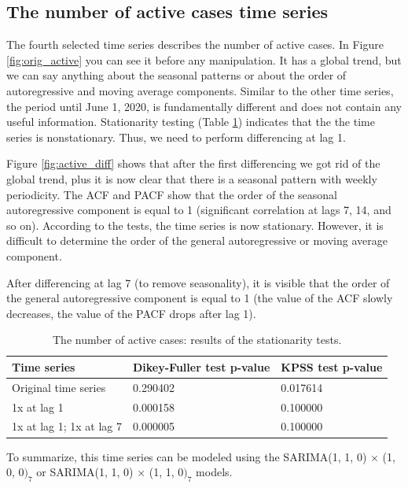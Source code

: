 \subsection{The number of active cases time series}

The fourth selected time series describes the number of active cases. In Figure \ref{fig:orig_active} you can see it before any manipulation. It has a global trend, but we can say anything about the seasonal patterns or about the order of autoregressive and moving average components. Similar to the other time series, the period until June 1, 2020, is fundamentally different and does not contain any useful information. Stationarity testing (Table \ref{tab:active_tests_table}) indicates that the the time series is nonstationary. Thus, we need to perform differencing at lag 1.

Figure \ref{fig:active_diff} shows that after the first differencing we got rid of the global trend, plus it is now clear that there is a seasonal pattern with weekly periodicity. The ACF and PACF show that the order of the seasonal autoregressive component is equal to 1 (significant correlation at lags 7, 14, and so on). According to the tests, the time series is now stationary. However, it is difficult to determine the order of the general autoregressive or moving average component. 

After differencing at lag 7 (to remove seasonality), it is visible that the order of the general autoregressive component is equal to 1 (the value of the ACF slowly decreases, the value of the PACF drops after lag 1).

\begin{table}[!ht]
    \centering
    \begin{tabular}{|p{3cm}||p{3cm}| p{3cm}|}
    \hline
    Time series & Dikey-Fuller test p-value & KPSS test p-value\\
    \hline
    Original time series& 0.290402 & 0.017614\\
	\hline
	1x at lag 1 & 0.000158 & 0.100000\\
	\hline
	1x at lag 1; 1x at lag 7 &  0.000005 & 0.100000\\
	\hline
\end{tabular}
    \caption{The number of active cases: results of the stationarity tests.}
    \label{tab:active_tests_table}
\end{table}

To summarize, this time series can be modeled using the SARIMA(1, 1, 0) $\times$ (1, 0, 0$)_7$ or SARIMA(1, 1, 0) $\times$ (1, 1, 0$)_7$ models.

